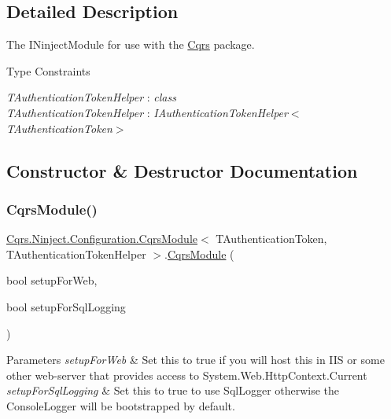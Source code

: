 \subsection{Detailed Description}
The I\+Ninject\+Module for use with the \hyperlink{namespaceCqrs}{Cqrs} package. 

\begin{Desc}
\item[Type Constraints]\begin{description}
\item[{\em T\+Authentication\+Token\+Helper} : {\em class}]\item[{\em T\+Authentication\+Token\+Helper} : {\em I\+Authentication\+Token\+Helper$<$T\+Authentication\+Token$>$}]\end{description}
\end{Desc}


\subsection{Constructor \& Destructor Documentation}
\mbox{\label{classCqrs_1_1Ninject_1_1Configuration_1_1CqrsModule_a59949d92c89d73b9edf2ee92397d5cb4}} 
\subsubsection{\texorpdfstring{Cqrs\+Module()}{CqrsModule()}}
{\footnotesize\ttfamily \hyperlink{classCqrs_1_1Ninject_1_1Configuration_1_1CqrsModule}{Cqrs.\+Ninject.\+Configuration.\+Cqrs\+Module}$<$ T\+Authentication\+Token, T\+Authentication\+Token\+Helper $>$.\hyperlink{classCqrs_1_1Ninject_1_1Configuration_1_1CqrsModule}{Cqrs\+Module} (\begin{DoxyParamCaption}\item[{bool}]{setup\+For\+Web,  }\item[{bool}]{setup\+For\+Sql\+Logging }\end{DoxyParamCaption})}


\begin{DoxyParams}{Parameters}
{\em setup\+For\+Web} & Set this to true if you will host this in I\+IS or some other web-\/server that provides access to System.\+Web.\+Http\+Context.\+Current\\
\hline
{\em setup\+For\+Sql\+Logging} & Set this to true to use Sql\+Logger otherwise the Console\+Logger will be bootstrapped by default.\\
\hline
\end{DoxyParams}


